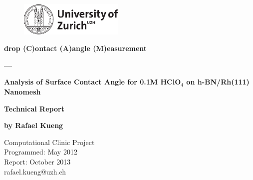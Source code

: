 \begin{figure}[th]
		\includegraphics[width=5cm]{pic/uzh}
	\label{fig:logo}
\end{figure}

\begin{center}

\vspace{1cm}


{\Large\bf drop (C)ontact (A)angle (M)easurement}

\vspace{.5cm}

{\Large\bf ---\\}

\vspace{.5cm}

{\Large\bf Analysis of Surface Contact Angle for 0.1M HClO$_4$ on h-BN/Rh(111) Nanomesh}

\vspace{2cm}

{\Huge\bf Technical Report}

\vspace{\fill}

{\Large\bf by Rafael Kueng}
\vspace{1cm}

\vspace{1cm}
Computational Clinic Project\\
Programmed: May 2012\\
Report: October 2013\\
rafael.kueng@uzh.ch

\end{center}
\newpage